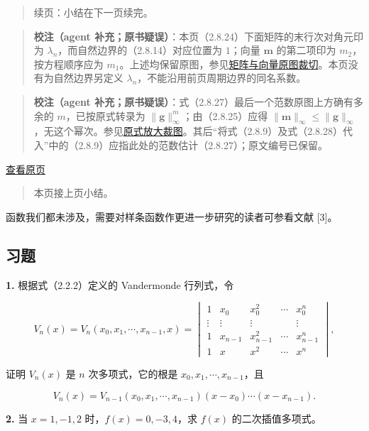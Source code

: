 \documentclass[
  10pt,
  fontset=fandol]{ctexart}
\begin{document}
\begin{quote}
续页：小结在下一页续完。
\end{quote}

\begin{quote}
\textbf{校注（agent 补充；原书疑误）}：本页（2.8.24）下面矩阵的末行次对角元印为 \(\lambda_n\)，而自然边界的（2.8.14）对应位置为 \(1\)；向量 \(\boldsymbol m\) 的第二项印为 \(m_2\)，按方程顺序应为 \(m_1\)。上述均保留原图，参见\href{../assets/ch02b/pdf-055-matrix-detail.png}{矩阵与向量原图裁切}。本页没有为自然边界另定义 \(\lambda_n\)，不能沿用前页周期边界的同名系数。
\end{quote}

\begin{quote}
\textbf{校注（agent 补充；原书疑误）}：式（2.8.27）最后一个范数原图上方确有多余的 \(m\)，已按原式转录为 \(\|\boldsymbol g\|_\infty^m\)；由（2.8.25）应得 \(\|\boldsymbol m\|_\infty\leqslant\|\boldsymbol g\|_\infty\)，无这个幂次。参见\href{../assets/ch02b/pdf-055-eq-2-8-27-detail.png}{原式放大裁图}。其后``将式（2.8.9）及式（2.8.28）代入''中的（2.8.9）应指此处的范数估计（2.8.27）；原文编号已保留。
\end{quote}

\href{../../source-images/pdf-056.jpeg}{查看原页}

\begin{quote}
本页接上页小结。
\end{quote}

函数我们都未涉及，需要对样条函数作更进一步研究的读者可参看文献 {[}3{]}。

\subsection{习题}\label{ux4e60ux9898}

\textbf{1.} 根据式（2.2.2）定义的 Vandermonde 行列式，令

\[V_n(x)=V_n(x_0,x_1,\cdots,x_{n-1},x)=\begin{vmatrix}
1&x_0&x_0^2&\cdots&x_0^n\\
\vdots&\vdots&\vdots&&\vdots\\
1&x_{n-1}&x_{n-1}^2&\cdots&x_{n-1}^n\\
1&x&x^2&\cdots&x^n
\end{vmatrix},\]

证明 \(V_n(x)\) 是 \(n\) 次多项式，它的根是 \(x_0,x_1,\cdots,x_{n-1}\)，且

\[V_n(x)=V_{n-1}(x_0,x_1,\cdots,x_{n-1})(x-x_0)\cdots(x-x_{n-1}).\]

\textbf{2.} 当 \(x=1,-1,2\) 时，\(f(x)=0,-3,4\)，求 \(f(x)\) 的二次插值多项式。
\end{document}
